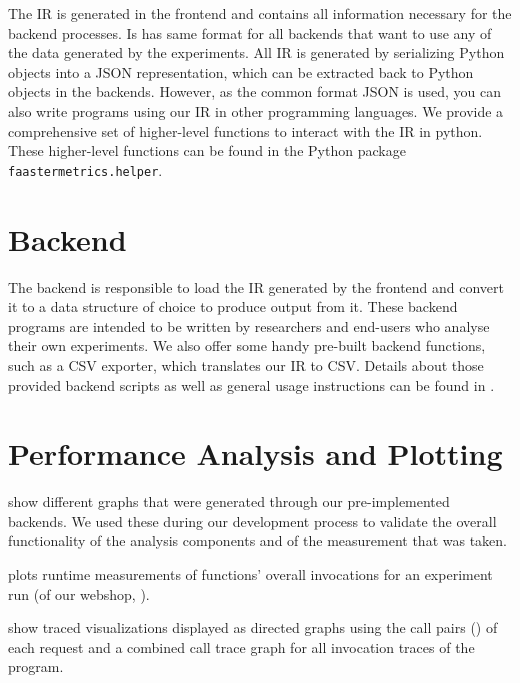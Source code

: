 \documentclass[../main.tex]{subfiles}
\begin{document}
The IR is generated in the frontend and contains all information necessary for the backend processes.
Is has same format for all backends that want to use any of the data generated by the experiments. 
All IR is generated by serializing Python objects into a JSON representation, 
which can be extracted back to Python objects in the backends. 
However, as the common format JSON is used, you can also write programs using our IR in other programming languages.
We provide a comprehensive set of higher-level functions to interact with the IR in python.
These higher-level functions can be found in the Python package \texttt{faastermetrics.helper}.

\section{Backend}%
\label{sec:analysisBackend}

The backend is responsible to load the IR generated by the frontend and convert it to a data structure of choice to produce output from it. 
These backend programs are intended to be written by researchers and end-users who analyse their own experiments. 
We also offer some handy pre-built backend functions, such as a CSV exporter, which translates our IR to CSV.\@
Details about those provided backend scripts as well as general usage instructions can be found in .

\section{Performance Analysis and Plotting}%
\label{sec:analysisPlots}

 show 
different graphs that were generated through our pre-implemented backends. 
We used these during our development process to validate the overall functionality of the analysis components and 
of the measurement that was taken. 

 plots runtime measurements of functions' overall invocations 
for an experiment run (of our webshop, ). 

 show traced visualizations displayed as directed graphs
using the call pairs () of each request and 
a combined call trace graph for all invocation traces of the program. 
\end{document}

